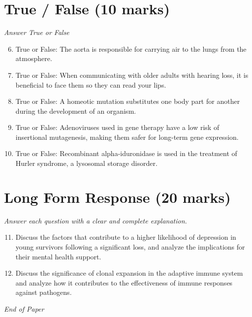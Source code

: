 \documentclass[12pt]{article}
\begin{document}
\section*{True / False (10 marks)}
\textit{Answer True or False}
\begin{enumerate}[label=\arabic*.]
\setcounter{enumi}{5}
\item True or False: The aorta is responsible for carrying air to the lungs from the atmosphere.
\item True or False: When communicating with older adults with hearing loss, it is beneficial to face them so they can read your lips.
\item True or False: A homeotic mutation substitutes one body part for another during the development of an organism.
\item True or False: Adenoviruses used in gene therapy have a low risk of insertional mutagenesis, making them safer for long-term gene expression.
\item True or False: Recombinant alpha-iduronidase is used in the treatment of Hurler syndrome, a lysosomal storage disorder.
\end{enumerate}

\section*{Long Form Response (20 marks)}
\textit{Answer each question with a clear and complete explanation.}
\begin{enumerate}[label=\arabic*.]
\setcounter{enumi}{10}
\item Discuss the factors that contribute to a higher likelihood of depression in young survivors following a significant loss, and analyze the implications for their mental health support.
\item Discuss the significance of clonal expansion in the adaptive immune system and analyze how it contributes to the effectiveness of immune responses against pathogens.
\end{enumerate}

\vfill
\noindent\textit{End of Paper}
\end{document}
